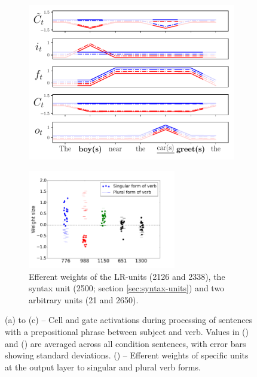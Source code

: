 \begin{figure}[ht]
\begin{subfigure}{0.45\textwidth}
    \label{fig:plural-unit}
    \end{subfigure}
    \begin{subfigure}{0.45\textwidth}
            \centering
            \includegraphics[width=\linewidth]{Figures/unit-timeseries-cartoon.pdf}
    \label{fig:cartoon}
    \end{subfigure}
    \begin{subfigure}{0.45\textwidth}
        \centering
        \includegraphics[height=4.3cm]{Figures/weight_dists_verbs.png}
        \caption{Efferent weights of the LR-units (\unit{2}{126} and \unit{2}{338}), the syntax unit (\unit{2}{500}; section \ref{sec:syntax-units}) and two arbitrary units (\unit{2}{1} and \unit{2}{650}).}
        \label{fig:output-weights}
    \end{subfigure}
    \caption{(a) to (c) -- Cell and gate activations during processing of sentences with a prepositional phrase between subject and verb. Values in () and () are averaged across all condition sentences, with error bars showing standard deviations. () -- Efferent weights of specific units at the output layer to singular and plural verb forms.}
\end{figure}

